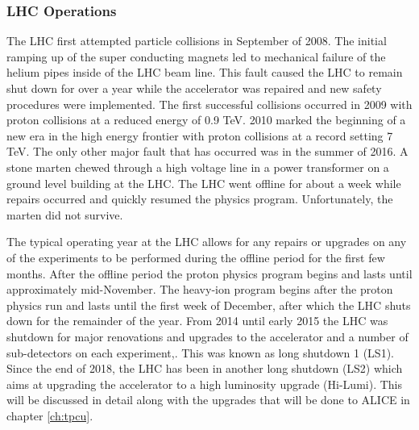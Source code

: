 \subsubsection{LHC Operations}
The LHC first attempted particle collisions in September of 2008.  The initial ramping up of the super conducting magnets led to mechanical failure of the helium pipes inside of the LHC beam line.  This fault caused the LHC to remain shut down for over a year while the accelerator was repaired and new safety procedures were implemented. The first successful collisions occurred in 2009 with proton collisions at a reduced energy of 0.9 TeV.  2010 marked the beginning of a new era in the high energy frontier with proton collisions at a record setting 7 TeV.  The only other major fault that has occurred was in the summer of 2016. A stone marten chewed through a high voltage line in a power transformer on a ground level building at the LHC.  The LHC went offline for about a week while repairs occurred and quickly resumed the physics program.  Unfortunately, the marten did not survive.

The typical operating year at the LHC allows for any repairs or upgrades on any of the experiments to be performed during the offline period for the first few months.  After the offline period the proton physics program begins and lasts until approximately mid-November.  The heavy-ion program begins after the proton physics run and lasts until the first week of December, after which the LHC shuts down for the remainder of the year.  From 2014 until early 2015 the LHC was shutdown for major renovations and upgrades to the accelerator and a number of sub-detectors on each experiment,. This was known as long shutdown 1 (LS1).  Since the end of 2018, the LHC has been in another long shutdown (LS2) which aims at upgrading the accelerator to a high luminosity upgrade (Hi-Lumi).  This will be discussed in detail along with the upgrades that will be done to ALICE in chapter \ref{ch:tpcu}.

